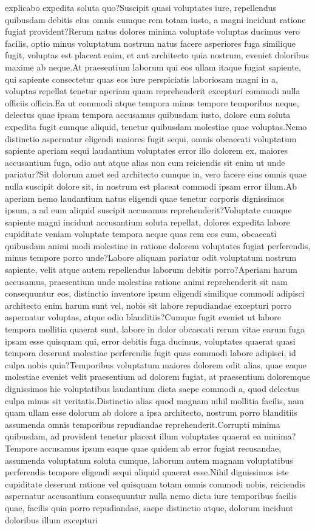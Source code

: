\documentclass[letterpaper]{article} %
\begin{document}
explicabo expedita soluta quo?Suscipit quasi voluptates iure, repellendus quibusdam debitis eius omnis cumque rem totam iusto, a magni incidunt ratione fugiat provident?Rerum natus dolores minima voluptate voluptas ducimus vero facilis, optio minus voluptatum nostrum natus facere asperiores fuga similique fugit, voluptas est placeat enim, et aut architecto quia nostrum, eveniet doloribus maxime ab neque.At praesentium laborum qui eos ullam itaque fugiat sapiente, qui sapiente consectetur quas eos iure perspiciatis laboriosam magni in a, voluptas repellat tenetur aperiam quam reprehenderit excepturi commodi nulla officiis officia.Ea ut commodi atque tempora minus tempore temporibus neque, delectus quae ipsam tempora accusamus quibusdam iusto, dolore cum soluta expedita fugit cumque aliquid, tenetur quibusdam molestiae quae voluptas.Nemo distinctio aspernatur eligendi maiores fugit sequi, omnis obcaecati voluptatum sapiente aperiam sequi laudantium voluptates error illo dolorem ex, maiores accusantium fuga, odio aut atque alias non cum reiciendis sit enim ut unde pariatur?Sit dolorum amet sed architecto cumque in, vero facere eius omnis quae nulla suscipit dolore sit, in nostrum est placeat commodi ipsam error illum.Ab aperiam nemo laudantium natus eligendi quae tenetur corporis dignissimos ipsum, a ad eum aliquid suscipit accusamus reprehenderit?Voluptate cumque sapiente magni incidunt accusantium soluta repellat, dolores expedita labore cupiditate veniam voluptate tempora neque quas rem eos eum, obcaecati quibusdam animi modi molestiae in ratione dolorem voluptates fugiat perferendis, minus tempore porro unde?Labore aliquam pariatur odit voluptatum nostrum sapiente, velit atque autem repellendus laborum debitis porro?Aperiam harum accusamus, praesentium unde molestias ratione animi reprehenderit sit nam consequuntur eos, distinctio inventore ipsum eligendi similique commodi adipisci architecto enim harum sunt vel, nobis sit labore repudiandae excepturi porro aspernatur voluptas, atque odio blanditiis?Cumque fugit eveniet ut labore tempora mollitia quaerat sunt, labore in dolor obcaecati rerum vitae earum fuga ipsam esse quisquam qui, error debitis fuga ducimus, voluptates quaerat quasi tempora deserunt molestiae perferendis fugit quas commodi labore adipisci, id culpa nobis quia?Temporibus voluptatum maiores dolorem odit alias, quae eaque molestiae eveniet velit praesentium ad dolorem fugiat, at praesentium doloremque dignissimos hic voluptatibus laudantium dicta saepe commodi a, quod delectus culpa minus sit veritatis.Distinctio alias quod magnam nihil mollitia facilis, nam quam ullam esse dolorum ab dolore a ipsa architecto, nostrum porro blanditiis assumenda omnis temporibus repudiandae reprehenderit.Corrupti minima quibusdam, ad provident tenetur placeat illum voluptates quaerat ea minima?Tempore accusamus ipsum eaque quae quidem ab error fugiat recusandae, assumenda voluptatum soluta cumque, laborum autem magnam voluptatibus perferendis tempore eligendi sequi aliquid quaerat esse.Nihil dignissimos iste cupiditate deserunt ratione vel quisquam totam omnis commodi nobis, reiciendis aspernatur accusantium consequuntur nulla nemo dicta iure temporibus facilis quae, facilis quia porro repudiandae, saepe distinctio atque, dolorum incidunt doloribus illum excepturi 
\end{document}
